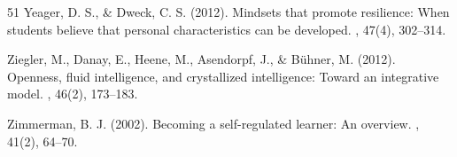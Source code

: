 \documentclass[12pt,a4paper]{article}
\begin{document}
\begin{thebibliography}{51}
Yeager, D. S., \& Dweck, C. S. (2012).
\newblock Mindsets that promote resilience: When students believe that personal characteristics can be developed.
, 47(4), 302--314.

Ziegler, M., Danay, E., Heene, M., Asendorpf, J., \& B\"uhner, M. (2012).
\newblock Openness, fluid intelligence, and crystallized intelligence: Toward an integrative model.
, 46(2), 173--183.

Zimmerman, B. J. (2002).
\newblock Becoming a self-regulated learner: An overview.
, 41(2), 64--70.

\end{thebibliography}
\end{document}
